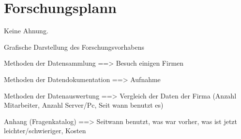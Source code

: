 \section{Forschungsplann}


Keine Ahnung.


Grafische Darstellung des Forschungsvorhabens 

Methoden der Datensammlung ==> Besuch einigen Firmen


Methoden der Datendokumentation  ==> Aufnahme


Methoden der Datenauswertung ==> Vergleich der Daten der Firma (Anzahl Mitarbeiter, Anzahl Server/Pc, Seit wann benutzt es)


Anhang (Fragenkatalog) ==> Seitwann benutzt, was war vorher, was ist jetzt leichter/schwieriger, Kosten